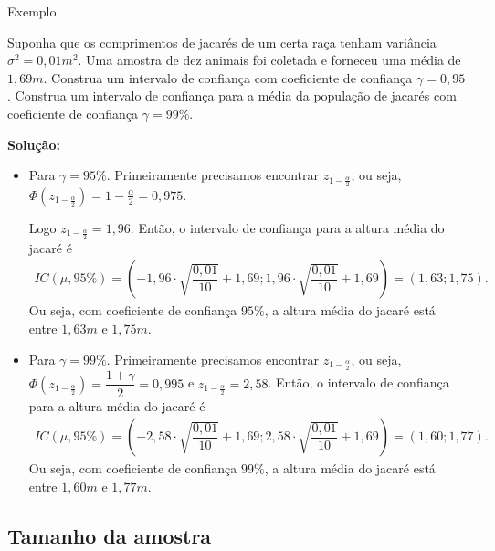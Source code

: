 \documentclass[8pt]{beamer}
\begin{document}
\begin{frame}{Exemplo}

{\small
 Suponha que os comprimentos de jacarés de um certa raça tenham variância $\sigma^2=0,01m^2$. Uma amostra de dez animais foi coletada e forneceu uma média de $1,69m$. Construa um intervalo de confiança
 com coeficiente de confiança $\gamma = 0,95$. Construa um intervalo de confiança para a média da população de jacarés com coeficiente de confiança $\gamma = 99\%$.
 \vfill

 \textbf{Solução:}
 \begin{itemize}
  \item Para $\gamma = 95\%$. Primeiramente precisamos encontrar $z_{1-\frac{\alpha}{2}}$, ou seja,  $ \Phi(z_{1-\frac{\alpha}{2}}) = 1 - \frac{\alpha}{2} = 0,975 $. 
  
  Logo $z_{1-\frac{\alpha}{2}} = 1,96$. Então, o intervalo de confiança para a altura média do jacaré é 
 \begin{align*}
  IC(\mu,95\%) = \left( -1,96 \cdot \sqrt{\dfrac{0,01}{10}} + 1,69;1,96 \cdot \sqrt{\dfrac{0,01}{10}} + 1,69 \right) = (1,63;1,75).
 \end{align*}
 Ou seja, com coeficiente de confiança $95\%$, a altura média do jacaré está entre $1,63m$ e $1,75m$.

 \item Para $\gamma = 99\%$. Primeiramente precisamos encontrar $z_{1-\frac{\alpha}{2}}$, ou seja,  $ \Phi(z_{1-\frac{\alpha}{2}}) = \dfrac{1+\gamma}{2} = 0,995$ e  $z_{1-\frac{\alpha}{2}} = 2,58$. Então, o intervalo de confiança para a altura média do jacaré é 
 \begin{align*}
  IC(\mu,95\%) = \left( -2,58 \cdot \sqrt{\dfrac{0,01}{10}} + 1,69;2,58 \cdot \sqrt{\dfrac{0,01}{10}} + 1,69 \right) = (1,60;1,77).
 \end{align*}
 Ou seja, com coeficiente de confiança $99\%$, a altura média do jacaré está entre $1,60m$ e $1,77m$.
 \end{itemize}
}
\end{frame}

\subsection{Tamanho da amostra}
\end{document}
